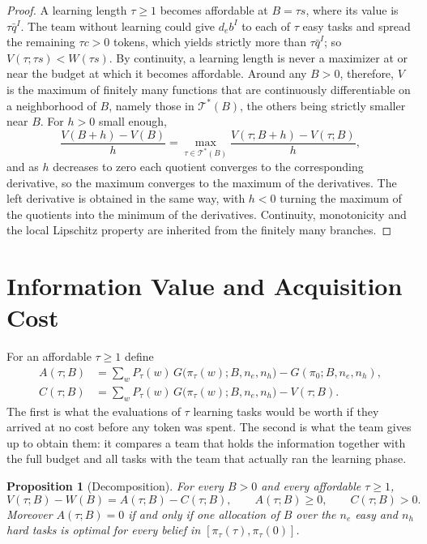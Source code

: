 \documentclass[11pt]{article}
\newtheorem{proposition}{Proposition}
\theoremstyle{definition}
\begin{document}
\begin{proof}
A learning length $\tau\ge1$ becomes affordable at $B=\tau s$, where its value is $\tau\bar q^I$. The team without learning could give $d_e b^I$ to each of $\tau$ easy tasks and spread the remaining $\tau c>0$ tokens, which yields strictly more than $\tau\bar q^I$; so $V(\tau;\tau s)<W(\tau s)$. By continuity, a learning length is never a maximizer at or near the budget at which it becomes affordable. Around any $B>0$, therefore, $V$ is the maximum of finitely many functions that are continuously differentiable on a neighborhood of $B$, namely those in $\mathcal T^*(B)$, the others being strictly smaller near $B$. For $h>0$ small enough,
\[
\frac{V(B+h)-V(B)}{h}=\max_{\tau\in\mathcal T^*(B)}\frac{V(\tau;B+h)-V(\tau;B)}{h},
\]
and as $h$ decreases to zero each quotient converges to the corresponding derivative, so the maximum converges to the maximum of the derivatives. The left derivative is obtained in the same way, with $h<0$ turning the maximum of the quotients into the minimum of the derivatives. Continuity, monotonicity and the local Lipschitz property are inherited from the finitely many branches.
\end{proof}

\section{Information Value and Acquisition Cost}

For an affordable $\tau\ge1$ define
\begin{align*}
A(\tau;B)&=\sum_{w}P_\tau(w)\,G\bigl(\pi_\tau(w);B,n_e,n_h\bigr)-G(\pi_0;B,n_e,n_h),\\
C(\tau;B)&=\sum_{w}P_\tau(w)\,G\bigl(\pi_\tau(w);B,n_e,n_h\bigr)-V(\tau;B).
\end{align*}
The first is what the evaluations of $\tau$ learning tasks would be worth if they arrived at no cost before any token was spent. The second is what the team gives up to obtain them: it compares a team that holds the information together with the full budget and all tasks with the team that actually ran the learning phase.

\begin{proposition}[Decomposition]\label{prop:decomp}
For every $B>0$ and every affordable $\tau\ge1$,
\[
V(\tau;B)-W(B)=A(\tau;B)-C(\tau;B),\qquad A(\tau;B)\ge0,\qquad C(\tau;B)>0 .
\]
Moreover $A(\tau;B)=0$ if and only if one allocation of $B$ over the $n_e$ easy and $n_h$ hard tasks is optimal for every belief in $[\pi_\tau(\tau),\pi_\tau(0)]$.
\end{proposition}
\end{document}
